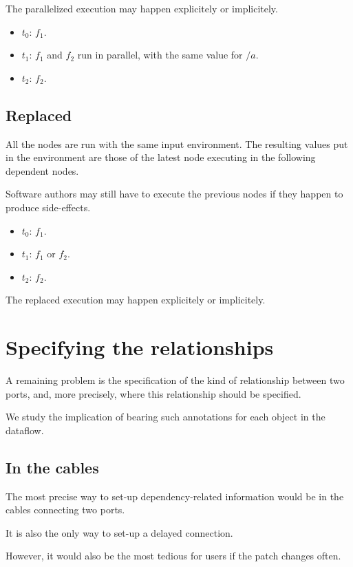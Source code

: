 \documentclass{article}
\begin{document}
    The parallelized execution may happen explicitely or implicitely.

    \begin{itemize}
        \item $t_0$: $f_1$.
        \item $t_1$: $f_1$ and $f_2$ run in parallel, with the same value for $/a$.
        \item $t_2$: $f_2$. 
    \end{itemize}
     
	\subsection{Replaced}
	All the nodes are run with the same input environment. 
	The resulting values put in the environment are those of the latest node executing in the following dependent nodes.
    
    Software authors may still have to execute the previous nodes if they happen to produce side-effects.
    
    \begin{itemize}
        \item $t_0$: $f_1$.
        \item $t_1$: $f_1$ or $f_2$.
        \item $t_2$: $f_2$. 
    \end{itemize}

    The replaced execution may happen explicitely or implicitely.
    
    \section{Specifying the relationships}
    A remaining problem is the specification of the kind of relationship between two ports, and, more precisely, 
    where this relationship should be specified.
    
    We study the implication of bearing such annotations for each object in the dataflow.

    \subsection{In the cables}
    The most precise way to set-up dependency-related information would be in 
    the cables connecting two ports. 
    
    It is also the only way to set-up a delayed connection.
    
    However, it would also be the most tedious for users if the patch changes often.
    
\end{document}
